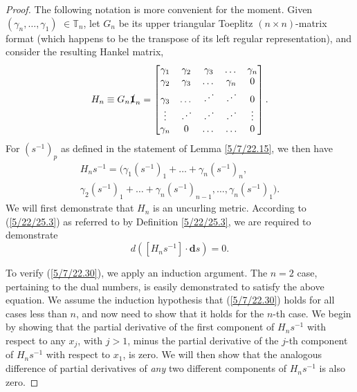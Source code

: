 \documentclass{amsart}
\theoremstyle{definition}
\numberwithin{theorem}{section}
\numberwithin{equation}{section}
\begin{document}
\enlargethispage{1cm}
\begin{proof} The following notation is more convenient for the moment.  Given $(\gamma_n,\dots,\gamma_1)$ $\in \mathbb{T}_n$, let $G_n$ be its upper triangular Toeplitz $(n\times n)$-matrix format (which happens to be the transpose of its left regular representation), and consider the resulting Hankel matrix, 
\begin{equation}\label{5/7/22.20} H_n \equiv G_n \slashed{\bf 1}_n = \begin{bmatrix} \gamma_1 & \gamma_2 & \gamma_3 & \dots & \gamma_n \\ \gamma_2 & \gamma_3 & \dots & \gamma_n & 0 \\ \gamma_3 & \dots & \iddots & \iddots & 0  \\ \vdots & \iddots & \iddots & \iddots & \vdots \\ \gamma_n & 0 & \dots & \ldots & 0 \end{bmatrix}.\end{equation}
For $\left( s^{-1} \right)_p$ as defined in the statement of Lemma \ref{5/7/22.15}, we then have
\begin{multline}  H_n s^{-1}   =  \Big( \gamma_1\left( s^{-1} \right)_1  + \dots + \gamma_n \left( s^{-1} \right)_n, \\ \gamma_2\left( s^{-1} \right)_1  + \dots + \gamma_n \left( s^{-1} \right)_{n-1}, 
  \dots , 
 \gamma_n \left( s^{-1} \right)_1 \Big). \label{5/7/22.40}
\end{multline}
 We will first demonstrate that $H_n$ is an uncurling metric.  According to (\ref{5/22/25.3}) as referred to by Definition \ref{5/22/25.3}, we are required to demonstrate 
\begin{equation}\label{5/7/22.30} d\left([H_n s^{-1}]\cdot \mathbf{d}s\right) = 0.\end{equation}  

To verify (\ref{5/7/22.30}), we apply an induction argument.  The $n=2$ case, pertaining to the dual numbers, is easily demonstrated to satisfy the above equation.  We assume the induction hypothesis that (\ref{5/7/22.30}) holds for all cases less than $n$, and now need to show that it holds for the $n$-th case.  
We begin by showing that the partial derivative of the first component of $H_n s^{-1}$ with respect to any $x_j$, with $j>1$, minus the partial derivative of the $j$-th component of $H_n s^{-1}$ with respect to $x_1$, is zero. We will then show that the analogous difference of partial derivatives of {\it any} two different components of $H_ns^{-1}$ is also zero.


\end{proof}
\end{document}
